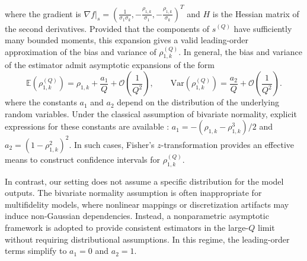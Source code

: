 %
where the gradient is $\nabla f|_{s} = (\frac{1}{\sigma_1\sigma_k},-\frac{\rho_{1,k}}{\sigma_1},-\frac{\rho_{1,k}}{\sigma_k} )^T$ and $H$ is the Hessian matrix of the second derivatives. Provided that the components of $s^{(Q)}$ have sufficiently many bounded moments, this expansion gives a valid leading-order approximation of the bias and variance of $\rho_{1,k}^{(Q)}$. In general, the bias and variance of the estimator admit asymptotic expansions of the form
%
\begin{equation*}
\label{eq:Expectation_var_rho}
    \mathbb{E}\left(\rho_{1,k}^{(Q)}\right) =\rho_{1,k}+\frac{a_1}{Q} + \mathcal{O}\left(\frac 1 {Q^2}\right),\qquad \text{Var}\left(\rho_{1,k}^{(Q)}\right)= \frac{a_2}{Q} + \mathcal{O}\left(\frac{1}{Q^2}\right).
\end{equation*}
%
where the constants $a_1$ and $a_2$ depend on the distribution of the underlying random variables. Under the classical assumption of bivariate normality, explicit expressions for these constants are available \cite{Fi:1915, Ha:2007, Ri:1932, So:1913}: $a_1 = -(\rho_{1,k} - \rho_{1,k}^3)/2$ and $a_2 = (1 - \rho_{1,k}^2)^2$. In such cases, Fisher's $z$-transformation \cite{Fi:1915} provides an effective means to construct confidence intervals for $\rho_{1,k}^{(Q)}$. 

In contrast, our setting does not assume a specific distribution for the model outputs. The bivariate normality assumption is often inappropriate for multifidelity models, where nonlinear mappings or discretization artifacts may induce non-Gaussian dependencies. Instead, a nonparametric asymptotic framework \cite{Og:2006, Pi:1937} is adopted to provide consistent estimators in the large-$Q$ limit without requiring distributional assumptions. In this regime, the leading-order terms simplify to $a_1 = 0$ and $a_2 = 1$.

